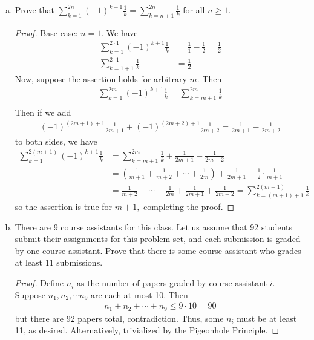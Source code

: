 \documentclass{article}
\begin{document}
\begin{enumerate}[(a)]
	\item Prove that $\sum_{k=1}^{2n}(-1)^{k+1}\frac{1}{k} = \sum_{k=n+1}^{2n}\frac{1}{k}$ for all $n\ge 1.$ 
		\begin{proof}
			Base case: $n=1.$ We have
			\begin{align*}
				\sum_{k=1}^{2\cdot 1}(-1)^{k+1}\frac{1}{k} &= \frac{1}{1}-\frac{1}{2} = \frac{1}{2} \\
				\sum_{k=1+1}^{2\cdot 1}\frac{1}{k} &= \frac{1}{2}
			\end{align*}
			Now, suppose the assertion holds for arbitrary $m.$ Then 
			\begin{align*}
				\sum_{k=1}^{2m}(-1)^{k+1}\frac{1}{k} = \sum_{k=m+1}^{2m}\frac{1}{k} \\
			\end{align*}
			Then if we add
			\begin{align*}
				(-1)^{(2m+1)+1}\frac{1}{2m+1} + (-1)^{(2m+2)+1}\frac{1}{2m+2} = \frac{1}{2m+1} - \frac{1}{2m+2}
			\end{align*}
			to both sides, we have
			\begin{align*}
				\sum_{k=1}^{2(m+1)} (-1)^{k+1}\frac{1}{k} &= \sum_{k=m+1}^{2m}\frac{1}{k} + \frac{1}{2m+1} - \frac{1}{2m+2} \\ 
				&= \left( \frac{1}{m+1} + \frac{1}{m+2} + \cdots + \frac{1}{2m} \right) + \frac{1}{2m+1} - \frac{1}{2}\cdot \frac{1}{m+1} \\
				&= \frac{1}{m+2} + \cdots + \frac{1}{2m} + \frac{1}{2m+1} + \frac{1}{2m+2} = \sum_{k=(m+1)+1}^{2(m+1)}\frac{1}{k}
			\end{align*}
			so the assertion is true for $m+1,$ completing the proof.
		\end{proof}

	\item There are 9 course assistants for this class. Let us assume that 92 students submit their assignments for this problem set, and each submission is graded by one course assistant. Prove that there is some course assistant who grades at least 11 submissions.
		\begin{proof}
			Define $n_i$ as the number of papers graded by course assistant $i.$ Suppose $n_1, n_2, \cdots n_9$ are each at most 10. Then
			\begin{align*}
				n_1+n_2+\cdots+n_9\le9\cdot 10 = 90
			\end{align*}
			but there are 92 papers total, contradiction. Thus, some $n_i$ must be at least 11, as desired. Alternatively, trivialized by the Pigeonhole Principle.
		\end{proof}


\end{enumerate}
\end{document}
